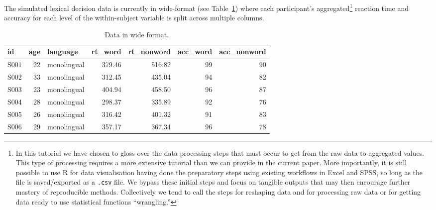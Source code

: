 \documentclass[
  english,
  doc,floatsintext]{apa6}
\begin{document}
The simulated lexical decision data is currently in wide-format (see Table~\ref{tab:wide-data}) where each participant's aggregated\footnote{In this tutorial we have chosen to gloss over the data processing steps that must occur to get from the raw data to aggregated values. This type of processing requires a more extensive tutorial than we can provide in the current paper. More importantly, it is still possible to use R for data visualisation having done the preparatory steps using existing workflows in Excel and SPSS, so long as the file is saved/exported as a \texttt{.csv} file. We bypass these initial steps and focus on tangible outputs that may then encourage further mastery of reproducible methods. Collectively we tend to call the steps for reshaping data and for processing raw data or for getting data ready to use statistical functions ``wrangling.''} reaction time and accuracy for each level of the within-subject variable is split across multiple columns.

\begin{table}

\caption{\label{tab:wide-data}Data in wide format.}
\centering
\begin{tabular}[t]{l|r|l|r|r|r|r}
\hline
id & age & language & rt\_word & rt\_nonword & acc\_word & acc\_nonword\\
\hline
S001 & 22 & monolingual & 379.46 & 516.82 & 99 & 90\\
\hline
S002 & 33 & monolingual & 312.45 & 435.04 & 94 & 82\\
\hline
S003 & 23 & monolingual & 404.94 & 458.50 & 96 & 87\\
\hline
S004 & 28 & monolingual & 298.37 & 335.89 & 92 & 76\\
\hline
S005 & 26 & monolingual & 316.42 & 401.32 & 91 & 83\\
\hline
S006 & 29 & monolingual & 357.17 & 367.34 & 96 & 78\\
\hline
\end{tabular}
\end{table}
\end{document}
